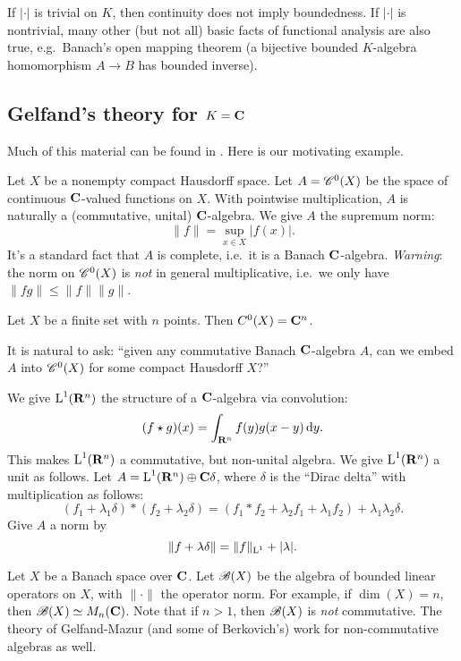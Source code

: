 If $|\cdot|$ is trivial on $K$, then continuity does not imply boundedness. If 
$|\cdot|$ is nontrivial, many other (but not all) basic facts of functional 
analysis are also true, e.g.~Banach's open mapping theorem (a bijective bounded 
$K$-algebra homomorphism $A\to B$ has bounded inverse). 





\subsection{Gelfand's theory for \texorpdfstring{$K=\mathbf{C}$}{K=C}}

Much of this material can be found in \cite[Ch.~10-11]{rudin-1991}. 
Here is our motivating example. 

\begin{example}
Let $X$ be a nonempty compact Hausdorff space. Let $A=\mathscr{C}^0(X)$ be the space of 
continuous $\mathbf{C}$-valued functions on $X$. With pointwise multiplication, $A$ is 
naturally a (commutative, unital) $\mathbf{C}$-algebra. We give $A$ the supremum norm: 
\[
  \|f\| = \sup_{x\in X} |f(x)| .
\]
It's a standard fact that $A$ is complete, i.e.~it is a Banach $\mathbf{C}$-algebra. 
\emph{Warning}: the norm on $\mathscr{C}^0(X)$ is \emph{not} in general multiplicative, 
i.e.~we only have $\|fg\|\leqslant \|f\|\|g\|$.
\end{example}

\begin{example}
Let $X$ be a finite set with $n$ points. Then $C^0(X)=\mathbf{C}^n$. 
\end{example}

It is natural to ask: ``given any commutative Banach $\mathbf{C}$-algebra $A$, can we 
embed $A$ into $\mathscr{C}^0(X)$ for some compact Hausdorff $X$?''

\begin{example}
We give $\operatorname{L}^1(\mathbf{R}^n)$ the structure of a $\mathbf{C}$-algebra via convolution:
\[
  (f\star g)(x) = \int_{\mathbf{R}^n} f(y) g(x-y)\, \mathrm{d} y .
\]
This makes $\operatorname{L}^1(\mathbf{R}^n)$ a commutative, but non-unital algebra. We give 
$\operatorname{L}^1(\mathbf{R}^n)$ a unit as follows. Let $A=\operatorname{L}^1(\mathbf{R}^n)\oplus\mathbf{C}\delta$, where 
$\delta$ is the ``Dirac delta'' with multiplication as follows:
\[
  (f_1+\lambda_1\delta) \ast (f_2+\lambda_2 \delta) = (f_1\ast f_2+\lambda_2 f_1 + \lambda_1 f_2) + \lambda_1 \lambda_2 \delta .
\]
Give $A$ a norm by 
\[
  \|f+\lambda\delta\| = \|f\|_{\operatorname{L}^1} + |\lambda| .
\]
\end{example}

\begin{example}
Let $X$ be a Banach space over $\mathbf{C}$. Let $\mathscr{B}(X)$ be the algebra of bounded 
linear operators on $X$, with $\|\cdot\|$ the operator norm. For example, if 
$\dim(X)=n$, then $\mathscr{B}(X)\simeq M_n(\mathbf{C})$. Note that if $n>1$, then $\mathscr{B}(X)$ is 
\emph{not} commutative. The theory of Gelfand-Mazur (and some of Berkovich's) 
work for non-commutative algebras as well. 
\end{example}

